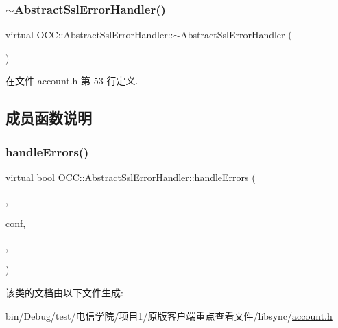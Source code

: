 \subsubsection{\texorpdfstring{$\sim$\+Abstract\+Ssl\+Error\+Handler()}{~AbstractSslErrorHandler()}}
{\footnotesize\ttfamily virtual O\+C\+C\+::\+Abstract\+Ssl\+Error\+Handler\+::$\sim$\+Abstract\+Ssl\+Error\+Handler (\begin{DoxyParamCaption}{ }\end{DoxyParamCaption})\hspace{0.3cm}{\ttfamily [virtual]}}



在文件 account.\+h 第 53 行定义.



\subsection{成员函数说明}
\mbox{\label{class_o_c_c_1_1_abstract_ssl_error_handler_a7cb32ea0a130998ce6646f6d2e13bc2f}} 
\subsubsection{\texorpdfstring{handle\+Errors()}{handleErrors()}}
{\footnotesize\ttfamily virtual bool O\+C\+C\+::\+Abstract\+Ssl\+Error\+Handler\+::handle\+Errors (\begin{DoxyParamCaption}\item[{Q\+List$<$ Q\+Ssl\+Error $>$}]{,  }\item[{const Q\+Ssl\+Configuration \&}]{conf,  }\item[{Q\+List$<$ Q\+Ssl\+Certificate $>$ $\ast$}]{,  }\item[{\hyperlink{namespace_o_c_c_a848616aedb9188e223c6b9867757fe69}{Account\+Ptr}}]{ }\end{DoxyParamCaption})\hspace{0.3cm}{\ttfamily [pure virtual]}}



该类的文档由以下文件生成\+:\begin{DoxyCompactItemize}
\item 
bin/\+Debug/test/电信学院/项目1/原版客户端重点查看文件/libsync/\hyperlink{account_8h}{account.\+h}\end{DoxyCompactItemize}
